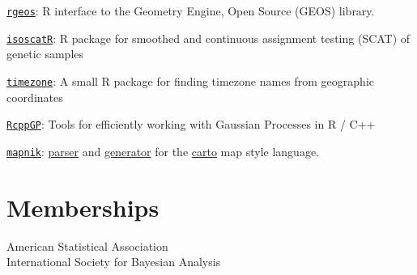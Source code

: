 \documentclass[margin,line]{res}
\begin{document}
\begin{resume}
\href{https://github.com/rundel/rgeos}{\texttt{rgeos}}: R interface to the Geometry Engine, Open Source (GEOS) library.

\vspace{-0.15cm}
\href{https://github.com/rundel/isoscatR}{\texttt{isoscatR}}: R package for smoothed and continuous assignment testing (SCAT) of genetic samples

\vspace{-0.15cm}
\href{https://github.com/rundel/timezone}{\texttt{timezone}}: A small R package for finding timezone names from geographic coordinates

\vspace{-0.15cm}
\href{https://github.com/rundel/RcppGP}{\texttt{RcppGP}}: Tools for efficiently working with Gaussian Processes in R / C++

\vspace{-0.15cm}
\href{http://mapnik.org}{\texttt{mapnik}}: \href{https://github.com/rundel/carto-parser}{parser} and \href{https://github.com/rundel/carto-generator}{generator} for the \href{https://github.com/mapbox/carto}{carto} map style language.

\vspace{4mm}

\section{\sc Memberships}
American Statistical Association \\
International Society for Bayesian Analysis

\end{resume}
\end{document}
